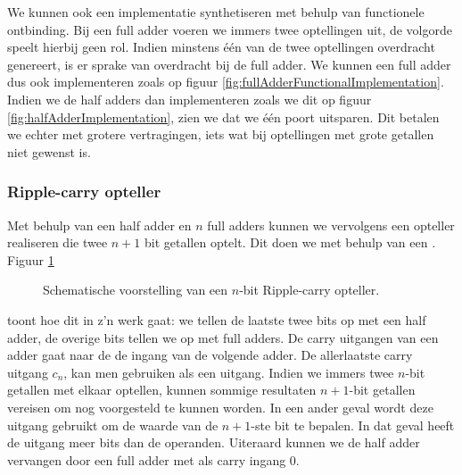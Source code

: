 We kunnen ook een implementatie synthetiseren met behulp van functionele ontbinding. Bij een full adder voeren we immers twee optellingen uit, de volgorde speelt hierbij geen rol. Indien minstens \'e\'en van de twee optellingen overdracht genereert, is er sprake van overdracht bij de full adder. We kunnen een full adder dus ook implementeren zoals op figuur \ref{fig:fullAdderFunctionalImplementation}. Indien we de half adders dan implementeren zoals we dit op figuur \ref{fig:halfAdderImplementation}, zien we dat we \'e\'en poort uitsparen. Dit betalen we echter met grotere vertragingen, iets wat bij optellingen met grote getallen niet gewenst is.
\subsubsection{Ripple-carry opteller}
Met behulp van een half adder en $n$ full adders kunnen we vervolgens een opteller realiseren die twee $n+1$ bit getallen optelt. Dit doen we met behulp van een . Figuur \ref{fig:rippleCarryAdder}
\begin{figure}[hbt]
\centering
{}
\caption{Schematische voorstelling van een $n$-bit Ripple-carry opteller.}
\label{fig:rippleCarryAdder}
\end{figure}
toont hoe dit in z'n werk gaat: we tellen de laatste twee bits op met een half adder, de overige bits tellen we op met full adders. De carry uitgangen van een adder gaat naar de de ingang van de volgende adder. De allerlaatste carry uitgang $c_n$, kan men gebruiken als een  uitgang. Indien we immers twee $n$-bit getallen met elkaar optellen, kunnen sommige resultaten $n+1$-bit getallen vereisen om nog voorgesteld te kunnen worden. In een ander geval wordt deze uitgang gebruikt om de waarde van de $n+1$-ste bit te bepalen. In dat geval heeft de uitgang meer bits dan de operanden. Uiteraard kunnen we de half adder vervangen door een full adder met als carry ingang 0.
